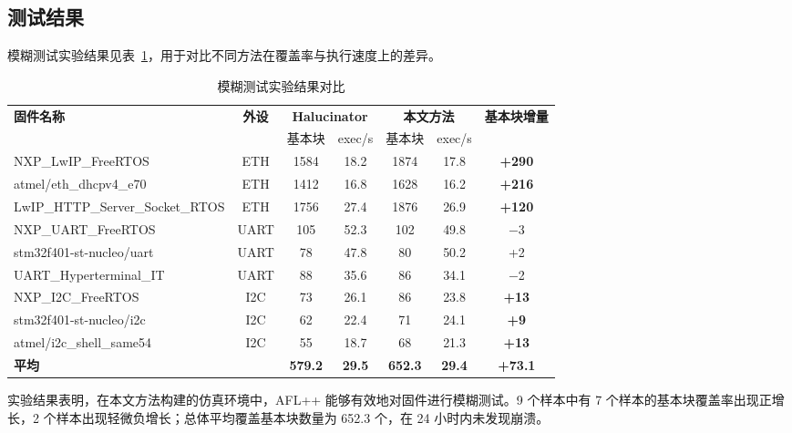 \subsection{测试结果}

模糊测试实验结果见表~\ref{tab:fuzz_results}，用于对比不同方法在覆盖率与执行速度上的差异。

\begin{table}[!htbp]
\centering
\caption{模糊测试实验结果对比}
\label{tab:fuzz_results}
\footnotesize
\begin{adjustbox}{max width=\textwidth}
\begin{tabular}{l c cc cc c}
\toprule
\multirow{2}{*}{\textbf{固件名称}} & \multirow{2}{*}{\textbf{外设}} & \multicolumn{2}{c}{\textbf{Halucinator}} & \multicolumn{2}{c}{\textbf{本文方法}} & \multirow{2}{*}{\textbf{基本块增量}} \\
\cmidrule(lr){3-4} \cmidrule(lr){5-6}
  & & 基本块 & exec/s & 基本块 & exec/s & \\
\midrule
NXP\_LwIP\_FreeRTOS & ETH & 1584 & 18.2 & 1874 & 17.8 & \textbf{+290} \\
atmel/eth\_dhcpv4\_e70 & ETH & 1412 & 16.8 & 1628 & 16.2 & \textbf{+216} \\
LwIP\_HTTP\_Server\_Socket\_RTOS & ETH & 1756 & 27.4 & 1876 & 26.9 & \textbf{+120} \\
\midrule
NXP\_UART\_FreeRTOS & UART & 105 & 52.3 & 102 & 49.8 & $-$3 \\
stm32f401-st-nucleo/uart & UART & 78 & 47.8 & 80 & 50.2 & +2 \\
UART\_Hyperterminal\_IT & UART & 88 & 35.6 & 86 & 34.1 & $-$2 \\
\midrule
NXP\_I2C\_FreeRTOS & I2C & 73 & 26.1 & 86 & 23.8 & \textbf{+13} \\
stm32f401-st-nucleo/i2c & I2C & 62 & 22.4 & 71 & 24.1 & \textbf{+9} \\
atmel/i2c\_shell\_same54 & I2C & 55 & 18.7 & 68 & 21.3 & \textbf{+13} \\
\midrule
\textbf{平均} & & \textbf{579.2} & \textbf{29.5} & \textbf{652.3} & \textbf{29.4} & \textbf{+73.1} \\
\bottomrule
\end{tabular}
\end{adjustbox}
\end{table}

实验结果表明，在本文方法构建的仿真环境中，AFL++ 能够有效地对固件进行模糊测试。9 个样本中有 7 个样本的基本块覆盖率出现正增长，2 个样本出现轻微负增长；总体平均覆盖基本块数量为 652.3 个，在 24 小时内未发现崩溃。

